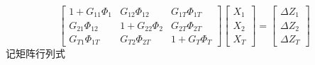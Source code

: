 \begin{equation}
\label{eq:60}
\left[ {\begin{array}{*{20}{c}}
  {1 + {G_{11}}{\Phi _1}}&{{G_{12}}{\Phi _{12}}}&{{G_{1T}}{\Phi _{1T}}} \\ 
  {{G_{21}}{\Phi _{12}}}&{1 + {G_{22}}{\Phi _2}}&{{G_{2T}}{\Phi _{2T}}} \\ 
  {{G_{T1}}{\Phi _{1T}}}&{{G_{T2}}{\Phi _{2T}}}&{1 + {G_T}{\Phi _T}} 
\end{array}} \right]
\begin{bmatrix}
  {X_1} \\
  {X_2} \\
  {X_T}
\end{bmatrix}
=
\begin{bmatrix}
  {\Delta {Z_1}} \\
  {\Delta {Z_2}} \\
  {\Delta {Z_T}}
\end{bmatrix}
\end{equation}
记矩阵行列式


